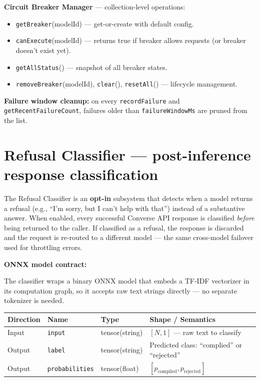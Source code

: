 \documentclass[10pt,letterpaper]{article}
\newcommand{\fn}[1]{\texttt{#1}}
\newcommand{\fld}[1]{\texttt{#1}}
\begin{document}
\medskip
\noindent\textbf{Circuit Breaker Manager} --- collection-level operations:
\begin{itemize}[nosep]
  \item \fn{getBreaker}(modelId) --- get-or-create with default config.
  \item \fn{canExecute}(modelId) --- returns true if breaker allows requests (or breaker doesn't exist yet).
  \item \fn{getAllStatus}() --- snapshot of all breaker states.
  \item \fn{removeBreaker}(modelId), \fn{clear}(), \fn{resetAll}() --- lifecycle management.
\end{itemize}

\noindent\textbf{Failure window cleanup:} on every \fn{recordFailure} and \fn{getRecentFailureCount}, failures older than \fld{failureWindowMs} are pruned from the list.

\section*{{\color{modelgreen}Refusal Classifier} \normalfont\small--- post-inference response classification}

The Refusal Classifier is an \textbf{opt-in} subsystem that detects when a model returns a refusal (e.g., ``I'm sorry, but I can't help with that'') instead of a substantive answer. When enabled, every successful Converse API response is classified \emph{before} being returned to the caller. If classified as a refusal, the response is discarded and the request is re-routed to a different model --- the same cross-model failover used for throttling errors.

\medskip
\noindent\textbf{ONNX model contract:}

The classifier wraps a binary ONNX model that embeds a TF-IDF vectorizer in its computation graph, so it accepts raw text strings directly --- no separate tokenizer is needed.

\smallskip
\begin{tabular}{@{}l l l l@{}}
\toprule
\textbf{Direction} & \textbf{Name} & \textbf{Type} & \textbf{Shape / Semantics} \\
\midrule
Input & \fld{input} & tensor(string) & $[N, 1]$ --- raw text to classify \\
Output & \fld{label} & tensor(string) & Predicted class: ``complied'' or ``rejected'' \\
Output & \fld{probabilities} & tensor(float) & $[p_{\text{complied}}, p_{\text{rejected}}]$ \\
\bottomrule
\end{tabular}
\end{document}
